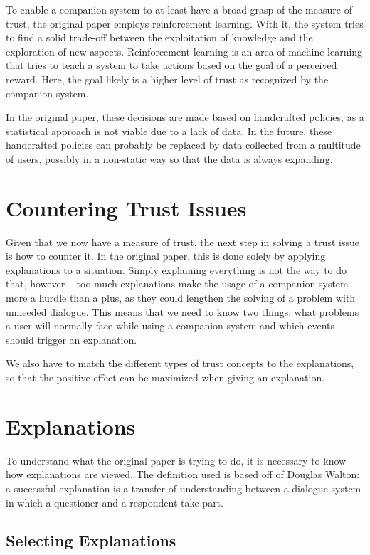 \documentclass[a4paper]{article}
\begin{document}
To enable a companion system to at least have a broad grasp of the measure of trust, the original paper employs reinforcement learning. With it, the system tries to find a solid trade-off between the exploitation of knowledge and the exploration of new aspects. Reinforcement learning is an area of machine learning that tries to teach a system to take actions based on the goal of a perceived reward. Here, the goal likely is a higher level of trust as recognized by the companion system.

In the original paper, these decisions are made based on handcrafted policies, as a statistical approach is not viable due to a lack of data. In the future, these handcrafted policies can probably be replaced by data collected from a multitude of users, possibly in a non-static way so that the data is always expanding.

\section{Countering Trust Issues}

Given that we now have a measure of trust, the next step in solving a trust issue is how to counter it. In the original paper, this is done solely by applying explanations to a situation. Simply explaining everything is not the way to do that, however – too much explanations make the usage of a companion system more a hurdle than a plus, as they could lengthen the solving of a problem with unneeded dialogue. This means that we need to know two things: what problems a user will normally face while using a companion system and which events should trigger an explanation.

We also have to match the different types of trust concepts to the explanations, so that the positive effect can be maximized when giving an explanation.

\section{Explanations}

To understand what the original paper is trying to do, it is necessary to know how explanations are viewed. The definition used is based off of Douglas Walton: a successful explanation is a transfer of understanding between a dialogue system in which a questioner and a respondent take part\cite{walton2004new}. 

\subsection{Selecting Explanations}
\end{document}
